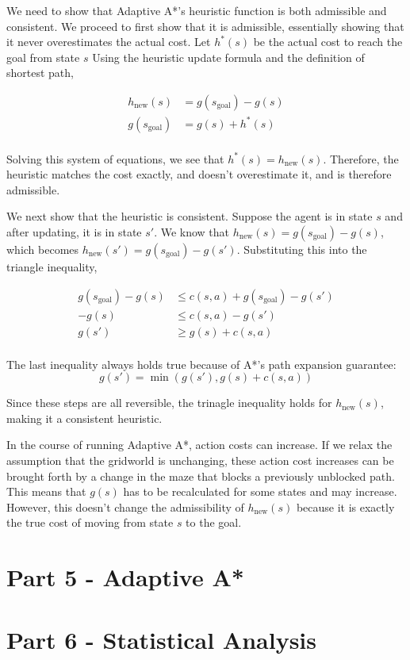 \documentclass[12pt]{article}
\begin{document}
We need to show that Adaptive A*'s heuristic function is both admissible and consistent.
We proceed to first show that it is admissible,
essentially showing that it never overestimates the actual cost.
Let $h^* (s)$ be the actual cost to reach the goal from state $s$
Using the heuristic update formula and the definition of shortest path,

\begin{align*}
    h_{\text{new}} (s) &= g(s_{\text{goal}}) - g(s) \\
    g(s_{\text{goal}}) &= g(s) + h^*(s) \\
\end{align*}

Solving this system of equations,
we see that 
$h^* (s) = h_{\text{new}} (s)$.
Therefore,
the heuristic matches the cost exactly,
and doesn't overestimate it,
and is therefore admissible.

We next show that the heuristic is consistent.
Suppose the agent is in state $s$ and after updating,
it is in state $s'$.
We know that 
$h_{\text{new}} (s) = g(s_{\text{goal}}) - g(s)$,
which becomes
$h_{\text{new}} (s') = g(s_{\text{goal}}) - g(s')$.
Substituting this into the triangle inequality,

\begin{align*}
g(s_{\text{goal}}) - g(s) & \leq c(s, a) + g(s_{\text{goal}}) - g(s') \\
-g(s) & \leq c(s, a) - g(s') \\
g(s') & \geq g(s) + c(s, a) \\
\end{align*}

The last inequality always holds true because of A*'s path expansion guarantee:
$$g(s') = \min(g(s'), g(s) + c(s, a))$$

Since these steps are all reversible,
the trinagle inequality holds for $h_{\text{new}} (s)$,
making it a consistent heuristic.

In the course of running Adaptive A*,
action costs can increase.
If we relax the assumption that the gridworld is unchanging,
these action cost increases can be brought forth by a change in the maze that blocks a previously unblocked path.
This means that 
$g(s)$ 
has to be recalculated for some states and may increase.
However,
this doesn't change the admissibility of $h_\text{new} (s)$
because it is exactly the true cost of moving from state 
$s$
to the goal.

\section{Part 5 - Adaptive A*}



\section{Part 6 - Statistical Analysis}
\end{document}
